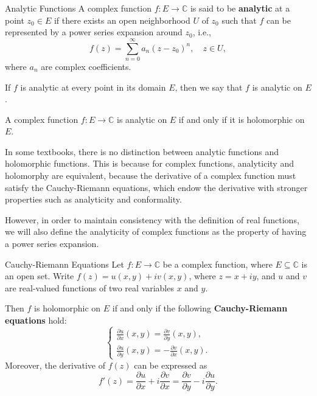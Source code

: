 \begin{definition}{Analytic Functions}\label{def:complex_analytic_function}
    A complex function \(f: E \to \mathbb{C}\) is said to be \textbf{analytic} at a point \(z_0 \in E\) if 
    there exists an open neighborhood \(U\) of \(z_0\) such that \(f\) can be represented by a power series expansion around \(z_0\), i.e.,
    \[
    f(z) = \sum_{n=0}^{\infty} a_n (z - z_0)^n, \quad z \in U,
    \]
    where \(a_n\) are complex coefficients.

    If \(f\) is analytic at every point in its domain \(E\), then we say that \(f\) is analytic on \(E\).
\end{definition}

\begin{theorem}
    A complex function \(f: E \to \mathbb{C}\) is analytic on \(E\) if and only if it is holomorphic on \(E\).
\end{theorem}

\begin{remark}
    In some textbooks, there is no distinction between analytic functions and holomorphic functions. 
    This is because for complex functions, analyticity and holomorphy are equivalent,
    because the derivative of a complex function must satisfy the Cauchy-Riemann equations, 
    which endow the derivative with stronger properties such as analyticity and conformality.

    However, in order to maintain consistency with the definition of real functions,
    we will also define the analyticity of complex functions as the property of having a power series expansion.
\end{remark}

\begin{theorem}{Cauchy-Riemann Equations}
    Let \(f: E \to \mathbb{C}\) be a complex function, where \(E \subseteq \mathbb{C}\) is an open set. 
    Write \(f(z) = u(x, y) + iv(x, y)\), where \(z = x + iy\), 
    and \(u\) and \(v\) are real-valued functions of two real variables \(x\) and \(y\). 

    Then \(f\) is holomorphic on \(E\)
    if and only if the following \textbf{Cauchy-Riemann equations} hold:
    \[
    \begin{cases}
        \frac{\partial u}{\partial x}(x, y) = \frac{\partial v}{\partial y}(x, y), \\
        \frac{\partial u}{\partial y}(x, y) = -\frac{\partial v}{\partial x}(x, y).
    \end{cases}
    \]
    Moreover, the derivative of \(f(z)\) can be expressed as
    \[
    f'(z) = \frac{\partial u}{\partial x} + i \frac{\partial v}{\partial x}
    = \frac{\partial v}{\partial y} - i \frac{\partial u}{\partial y}.
    \]
\end{theorem}

